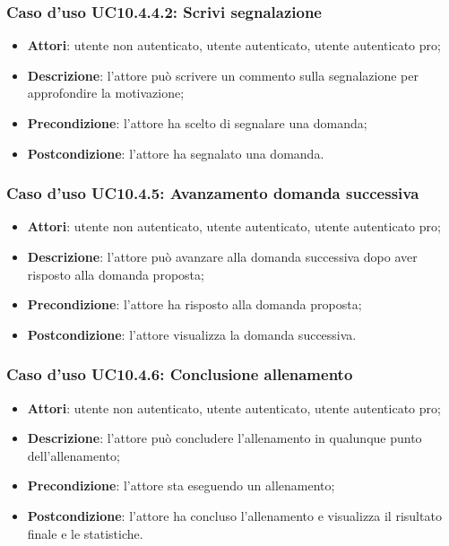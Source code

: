 \subsubsection{Caso d'uso UC10.4.4.2: Scrivi segnalazione}
	\begin{itemize}
		\item \textbf{Attori}: utente non autenticato, utente autenticato, utente autenticato pro;
		\item \textbf{Descrizione}: l'attore può scrivere un commento sulla segnalazione per approfondire la motivazione;
		\item \textbf{Precondizione}: l'attore ha scelto di segnalare una domanda;
		\item \textbf{Postcondizione}: l'attore ha segnalato una domanda.
	\end{itemize}
\subsubsection{Caso d'uso UC10.4.5: Avanzamento domanda successiva}
	\begin{itemize}
		\item \textbf{Attori}: utente non autenticato, utente autenticato, utente autenticato pro;
		\item \textbf{Descrizione}: l'attore può avanzare alla domanda successiva dopo aver risposto alla domanda proposta; 
		\item \textbf{Precondizione}: l'attore ha risposto alla domanda proposta;
		\item \textbf{Postcondizione}: l'attore visualizza la domanda successiva.
	\end{itemize}
\subsubsection{Caso d'uso UC10.4.6: Conclusione allenamento}
	\begin{itemize}
		\item \textbf{Attori}: utente non autenticato, utente autenticato, utente autenticato pro;
		\item \textbf{Descrizione}: l'attore può concludere l'allenamento in qualunque punto dell'allenamento;
		\item \textbf{Precondizione}: l'attore sta eseguendo un allenamento;
		\item \textbf{Postcondizione}: l'attore ha concluso l'allenamento e visualizza il risultato finale e le statistiche.
	\end{itemize}